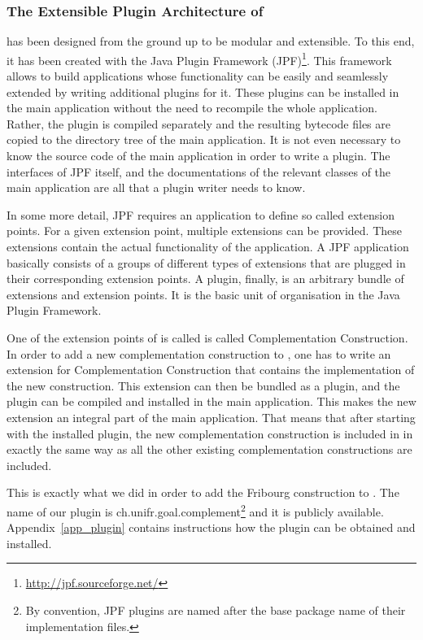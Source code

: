 \subsubsection{The Extensible Plugin Architecture of \goal}
\goal{} has been designed from the ground up to be modular and extensible. To this end, it has been created with the Java Plugin Framework (JPF)\footnote{\url{http://jpf.sourceforge.net/}}. This framework allows to build applications whose functionality can be easily and seamlessly extended by writing additional plugins for it. These plugins can be installed in the main application without the need to recompile the whole application. Rather, the plugin is compiled separately and the resulting bytecode files are copied to the directory tree of the main application. It is not even necessary to know the source code of the main application in order to write a plugin. The interfaces of JPF itself, and the documentations of the relevant classes of the main application are all that a plugin writer needs to know.

In some more detail, JPF requires an application to define so called extension points. For a given extension point, multiple extensions can be provided. These extensions contain the actual functionality of the application. A JPF application basically consists of a groups of different types of extensions that are plugged in their corresponding extension points. A plugin, finally, is an arbitrary bundle of extensions and extension points. It is the basic unit of organisation in the Java Plugin Framework.

One of the extension points of \goal{} is called is called \textsf{Complementation Construction}. In order to add a new complementation construction to \goal, one has to write an extension for \textsf{Complementation Construction} that contains the implementation of the new construction. This extension can then be bundled as a plugin, and the plugin can be compiled and installed in the main application. This makes the new extension an integral part of the main application. That means that after starting \goal{} with the installed plugin, the new complementation construction is included in \goal{} in exactly the same way as all the other existing complementation constructions are included.

This is exactly what we did in order to add the Fribourg construction to \goal. The name of our plugin is \textsf{ch.unifr.goal.complement}\footnote{By convention, JPF plugins are named after the base package name of their implementation files.} and it is publicly available. Appendix~\ref{app_plugin} contains instructions how the plugin can be obtained and installed.

